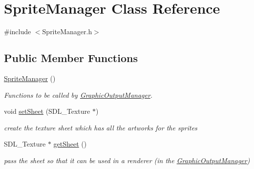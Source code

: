 \hypertarget{class_sprite_manager}{}\section{Sprite\+Manager Class Reference}
\label{class_sprite_manager}


{\ttfamily \#include $<$Sprite\+Manager.\+h$>$}

\subsection*{Public Member Functions}
\begin{DoxyCompactItemize}
\item 
\mbox{\label{class_sprite_manager_a757bd0abdc5551dd0420f7f7cfc81994}} 
\mbox{\hyperlink{class_sprite_manager_a757bd0abdc5551dd0420f7f7cfc81994}{Sprite\+Manager}} ()
\begin{DoxyCompactList}\small\item\em Functions to be called by \mbox{\hyperlink{class_graphic_output_manager}{Graphic\+Output\+Manager}}. \end{DoxyCompactList}\item 
\mbox{\label{class_sprite_manager_a39235ee747f04d812b550ce235660ee5}} 
void \mbox{\hyperlink{class_sprite_manager_a39235ee747f04d812b550ce235660ee5}{set\+Sheet}} (S\+D\+L\+\_\+\+Texture $\ast$)
\begin{DoxyCompactList}\small\item\em create the texture sheet which has all the artworks for the sprites \end{DoxyCompactList}\item 
\mbox{\label{class_sprite_manager_a402c0e54e5317aeabd4c16d669e4045e}} 
S\+D\+L\+\_\+\+Texture $\ast$ \mbox{\hyperlink{class_sprite_manager_a402c0e54e5317aeabd4c16d669e4045e}{get\+Sheet}} ()
\begin{DoxyCompactList}\small\item\em pass the sheet so that it can be used in a renderer (in the \mbox{\hyperlink{class_graphic_output_manager}{Graphic\+Output\+Manager}}) \end{DoxyCompactList}\item 
\mbox{\label{class_sprite_manager_af89d1ca81d4ae6126e7916947bee84b7}} 

\end{DoxyCompactItemize}
